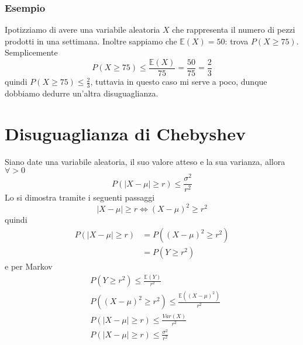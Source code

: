 \documentclass[11pt]{report}
\begin{document}
\subsubsection{Esempio}
Ipotizziamo di avere una variabile aleatoria $X$ che rappresenta il numero di pezzi prodotti in una settimana. Inoltre sappiamo che $\mathbb{E}(X) = 50$: trova $P(X \geq 75)$.\\
Semplicemente
\begin{equation}
    P(X \geq 75) \leq \frac{\mathbb{E}(X)}{75} = \frac{50}{75} = \frac{2}{3}
\end{equation}
quindi $P(X \geq 75) \leq \frac{2}{3}$, tuttavia in questo caso mi serve a poco, dunque dobbiamo dedurre un'altra disuguaglianza.

\section{Disuguaglianza di Chebyshev}
Siano date una variabile aleatoria, il suo valore atteso e la sua varianza, allora $\forall > 0$
\begin{equation}
    P(\mid X - \mu \mid \geq r) \leq \frac{\sigma^2}{r^2}
\end{equation}
Lo si dimostra tramite i seguenti passaggi
\begin{equation}
    \mid X - \mu \mid \geq r \iff (X - \mu)^2 \geq r^2
\end{equation}
quindi
\begin{equation}
    \begin{split}
        P(\mid X - \mu \mid \geq r) & = P((X - \mu)^2 \geq r^2)\\
        & = P(Y \geq r^2)
    \end{split}
\end{equation}
e per Markov
\begin{equation}
    \begin{split}
        & P(Y \geq r^2) \leq \frac{\mathbb{E}(Y)}{r^2}\\
        & P((X - \mu)^2 \geq r^2) \leq \frac{\mathbb{E}((X - \mu)^2)}{r^2}\\
        & P(\mid X - \mu \mid \geq r) \leq \frac{Var(X)}{r^2}\\
        & P(\mid X - \mu \mid \geq r) \leq \frac{\sigma^2}{r^2}
    \end{split}
\end{equation}
\end{document}
